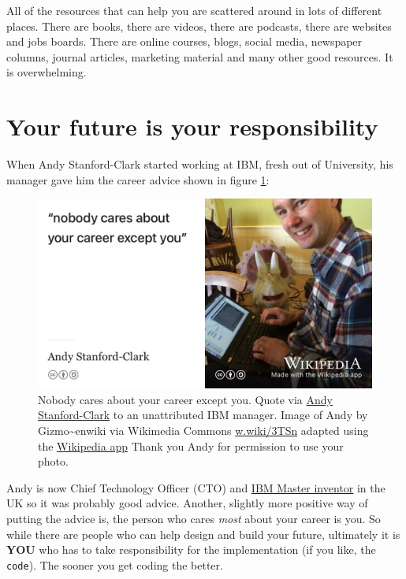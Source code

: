 \documentclass[
]{book}
\begin{document}
All of the resources that can help you are scattered around in lots of different places. There are books, there are videos, there are podcasts, there are websites and jobs boards. There are online courses, blogs, social media, newspaper columns, journal articles, marketing material and many other good resources. It is overwhelming.

\hypertarget{responsibility}{%
\section{Your future is your responsibility}\label{responsibility}}

When Andy Stanford-Clark started working at IBM, fresh out of University, his manager gave him the career advice shown in figure \ref{fig:andysc-fig}:

\begin{figure}

{\centering \includegraphics[width=0.99\linewidth]{images/nobody-cares-about-your-career-except-you} 

}

\caption{Nobody cares about your career except you. Quote via \href{https://en.wikipedia.org/wiki/Andy_Stanford-Clark}{Andy Stanford-Clark} \citep{andystanfordclark} to an unattributed IBM manager. Image of Andy by Gizmo\textasciitilde enwiki via Wikimedia Commons \href{https://w.wiki/3TSn}{w.wiki/3TSn} adapted using the \href{https://apps.apple.com/us/app/wikipedia/id324715238}{Wikipedia app} Thank you Andy for permission to use your photo.}\label{fig:andysc-fig}
\end{figure}



Andy is now Chief Technology Officer (CTO) and \href{https://en.wikipedia.org/wiki/IBM_Master_Inventor}{IBM Master inventor} in the UK so it was probably good advice. Another, slightly more positive way of putting the advice is, the person who cares \emph{most} about your career is you. So while there are people who can help design and build your future, ultimately it is \textbf{YOU} who has to take responsibility for the implementation (if you like, the \texttt{code}). The sooner you get coding the better.
\end{document}
